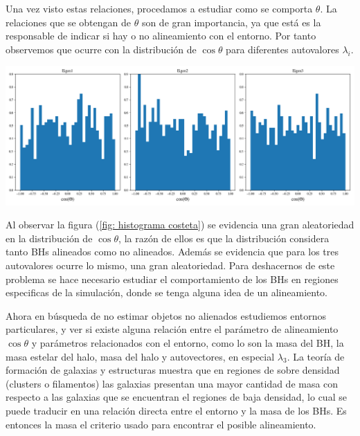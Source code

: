 


Una vez visto estas relaciones, procedamos a estudiar como se comporta $\theta$. La relaciones que se obtengan de $\theta$ son de gran importancia, ya que está es la responsable de indicar si hay o no alineamiento con el entorno. Por tanto observemos que ocurre con la distribución de $\cos \theta$ para diferentes autovalores $\lambda_{i}$.
%
\begin{center}
\includegraphics[scale=.35]{./figures/6_Resultados/cosmo01/histograma_cos_theta.png}
\label{fig: histograma costeta}
\end{center}
%
Al observar la figura (\ref{fig: histograma costeta}) se evidencia una gran aleatoriedad en la distribución de $\cos\theta$, la razón de ellos es que la distribución considera tanto BHs alineados como no alineados. Además se evidencia que para los tres autovalores ocurre lo mismo, una gran aleatoriedad. Para deshacernos de este problema se hace necesario estudiar el comportamiento de los BHs en regiones especificas de la simulación, donde se tenga alguna idea de un alineamiento.  

Ahora en búsqueda de no estimar objetos no alienados estudiemos entornos particulares, y ver si existe alguna relación entre el parámetro de alineamiento $\cos\theta$ y parámetros relacionados con el entorno, como lo son la masa del BH, la masa estelar del halo, masa del halo y autovectores, en especial $\lambda_{3}$. La teoría de formación de galaxias y estructuras muestra que en regiones de sobre densidad (clusters o filamentos) las galaxias presentan una mayor cantidad de masa  con respecto a las galaxias que se encuentran el regiones de baja densidad, lo cual se puede traducir en una relación directa entre el entorno y la masa de los BHs. Es entonces la masa el criterio usado para encontrar el posible alineamiento. 

